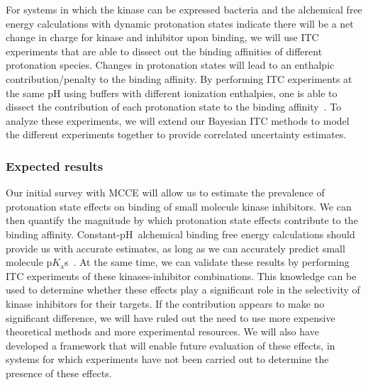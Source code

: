 \documentclass[10pt,final]{article}
\newcommand{\pH}{p$\mathrm{H}$\ }
\newcommand{\pKas}{p$K_\mathrm{a}$s\ }
\begin{document}
For systems in which the kinase can be expressed bacteria and the alchemical free energy calculations with dynamic protonation states indicate there will be a net change in charge for kinase and inhibitor upon binding, we will use ITC experiments that are able to dissect out the binding affinities of different protonation species.
%
Changes in protonation states will lead to an enthalpic contribution/penalty to the binding affinity.
%
By performing ITC experiments at the same pH using buffers with different ionization enthalpies, one is able to dissect the contribution of each protonation state to the binding affinity~\autocite{Baker1996a,Neeb2014a}.
%
To analyze these experiments, we will extend our Bayesian ITC methods to model the different experiments together to provide correlated uncertainty estimates.

\subsubsection*{Expected results}
Our initial survey with MCCE will allow us to estimate the prevalence of protonation state effects on binding of small molecule kinase inhibitors. 
%
We can then quantify the magnitude by which protonation state effects contribute to the binding affinity.
%
Constant-\pH alchemical binding free energy calculations should provide us with accurate estimates, as long as we can accurately predict small molecule \pKas. 
%
At the same time, we can validate these results by performing ITC experiments of these kinases-inhibitor combinations.
%
This knowledge can be used to determine whether these effects play a significant role in the selectivity of kinase inhibitors for their targets.
%
If the contribution appears to make no significant difference, we will have ruled out the need to use more expensive theoretical methods and more experimental resources.
%
We will also have developed a framework that will enable future evaluation of these effects, in systems for which experiments have not been carried out to determine the presence of these effects.
\end{document}
